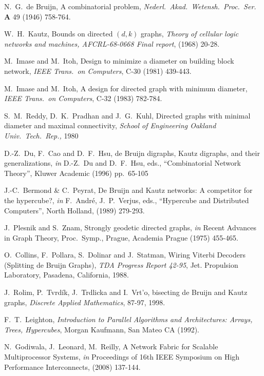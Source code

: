 \documentclass[12pt]{article}
\begin{document}
\begin{thebibliography}{10}


N.\  G.\ de Bruijn, A combinatorial problem,
{\it Nederl.\ Akad.\ Wetensh.\ Proc.\ Ser. } {\bf A}
49 (1946) 758-764.

W.\ H.\ Kautz, Bounds on directed $(d, k)$ graphs,
{\it Theory of cellular logic networks and machines, AFCRL-68-0668
Final report}, (1968) 20-28.

M.\ Imase and M.\ Itoh, Design to minimize a diameter on building
block network, {\it IEEE Trans.\ on Computers}, C-30 (1981) 439-443.

M.\ Imase and M.\ Itoh, A design for directed graph with minimum
diameter, {\it IEEE Trans.\ on Computers}, C-32 (1983) 782-784.

S.\ M.\ Reddy, D.\ K.\ Pradhan and J.\ G.\ Kuhl, Directed graphs with
minimal diameter and maximal connectivity,
{\it School of Engineering Oakland Univ.\ Tech.\ Rep.,} 1980
 
D.-Z.\ Du, F.\ Cao and D.\ F.\ Hsu, de Bruijn digraphs, Kautz
digraphs, and their generalizations,
{\it in} D.-Z.\ Du and D.\ F.\ Hsu, eds., ``Combinatorial Network
Theory'', Kluwer Academic (1996) pp.\ 65-105

J.-C.\ Bermond \& C.\  Peyrat, De Bruijn and Kautz networks: A
competitor for the hypercube?, {\it in} F.\ Andr\'e, J.\ P.\ Verjus,
eds., ``Hypercube and Distributed Computers'', North Holland,  (1989) 279-293.

J.\ Plesnik and S.\ Znam, Strongly geodetic directed graphs, {\it in}
Recent Advances in Graph Theory, Proc.\ Symp., Prague, Academia
  Prague (1975) 455-465.

 O.\ Collins, F.\ Pollara, S.\ Dolinar and J.\
Statman, Wiring Viterbi Decoders (Splitting de Bruijn Graphs), 
{\it TDA
Progress Report 42-95}, Jet. Propulsion Laboratory, Pasadena,
California, 1988.

J.\ Rolim, P.\ Tvrd\'ik, J.\ Trdlicka and I.\ Vrt'o, bisecting de
Bruijn and Kautz graphs, 
{\it Discrete Applied Mathematics}, 87-97, 1998.

F.\ T.\ Leighton, {\it Introduction to Parallel Algorithms and
Architectures: Arrays, Trees, Hypercubes}, Morgan Kaufmann, San Mateo
CA (1992).

N.\  Godiwala, J.\  Leonard, M.\  Reilly, A Network Fabric for  
Scalable Multiprocessor Systems, {\it in} Proceedings of
16th IEEE Symposium on High  
Performance Interconnects, (2008) 137-144.



\end{thebibliography}
\end{document}
